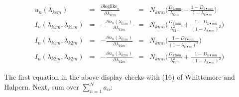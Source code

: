 \documentclass[11pt]{article}
\begin{document}
\begin{align}
u_n(\lambda_{kem}) & = &
                      \frac{\partial \mbox{loglike}_n}{\partial
                      \lambda_{kem}} 
           & = &  N_{kmn} \Biggl( 
                      \frac{ D_{kemn} }{ \lambda_{kem} } 
                      - \frac{  1 - D_{k\bullet mn}  }{  1-\lambda_{k\bullet m} }
                      \Biggl)\\
I_n(\lambda_{k1m},\lambda_{k1m})  & = &
                     - \frac{ \partial u_n(\lambda_{k1m}) }{ \partial \lambda_{k1m}  } 
            & = &  N_{kmn} \Biggl(
                    \frac{ D_{k1mn} }{ \lambda_{k1m}^2 } 
                     + \frac{  1 - D_{k\bullet mn}  }{  (1-\lambda_{k\bullet m})^2 }
                     \Biggl)\\
I_n(\lambda_{k1m},\lambda_{k2m})  & = &
                     - \frac{ \partial u_n(\lambda_{k1m}) }{ \partial \lambda_{k2m}  } 
           & = &  N_{kmn} \Biggl(
                    \frac{  1 - D_{k\bullet mn}  }{  (1-\lambda_{k\bullet m})^2 }
                    \Biggl)\\
I_n(\lambda_{k2m},\lambda_{k2m})  & = &
                     - \frac{ \partial u_n(\lambda_{k2m}) }{ \partial \lambda_{k2m}  } 
             & = &   N_{kmn} \Biggl(
                   \frac{ D_{k2mn} }{ \lambda_{k2m}^2 } 
                  + \frac{  1 - D_{k\bullet mn}  }{  (1-\lambda_{k\bullet m})^2 }
\Biggl) \label{eq:eqnLittleU}
\end{align}


The first equation in the above display checks with
(16) of Whittemore and Halpern. Next, sum over $\sum_{n=1}^N
a_n$:
\end{document}
